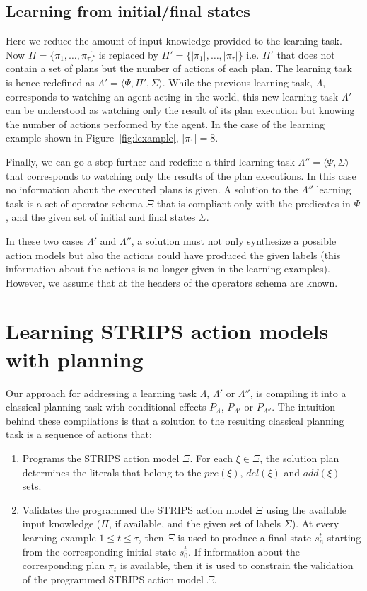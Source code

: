 \documentclass[letterpaper]{article} %
\newcommand{\tup}[1]{{\langle #1 \rangle}}
\begin{document}
\subsection{Learning from initial/final states}
Here we reduce the amount of input knowledge provided to the learning task. Now $\Pi=\{\pi_1,\ldots,\pi_{\tau}\}$ is replaced by $\Pi'=\{|\pi_1|,\ldots,|\pi_{\tau}|\}$ i.e. $\Pi'$ that does not contain a set of plans but the number of actions of each plan. The learning task is hence redefined as $\Lambda'=\tup{\Psi,\Pi',\Sigma}$. While the previous learning task, $\Lambda$, corresponds to watching an agent acting in the world, this new learning task $\Lambda'$ can be understood as watching only the result of its plan execution but knowing the number of actions performed by the agent. In the case of the learning example shown in Figure~\ref{fig:lexample}, $|\pi_1|=8$. 

Finally, we can go a step further and redefine a third learning task $\Lambda''=\tup{\Psi,\Sigma}$ that corresponds to watching only the results of the plan executions. In this case no information about the executed plans is given. A solution to the $\Lambda''$ learning task is a set of operator schema $\Xi$ that is compliant only with the predicates in $\Psi$, and the given set of initial and final states $\Sigma$.

In these two cases $\Lambda'$ and $\Lambda''$, a solution must not only synthesize a possible action models but also the actions could have produced the given labels (this information about the actions is no longer given in the learning examples). However, we assume that at the headers of the operators schema are known. 


\section{Learning STRIPS action models with planning}
Our approach for addressing a learning task $\Lambda$, $\Lambda'$ or $\Lambda''$, is compiling it into a classical planning task with conditional effects $P_{\Lambda}$, $P_{\Lambda'}$ or $P_{\Lambda''}$. The intuition behind these compilations is that a solution to the resulting classical planning task is a sequence of actions that:
\begin{enumerate}
\item Programs the STRIPS action model $\Xi$. For each $\xi\in\Xi$, the solution plan determines the literals that belong to the $pre(\xi)$, $del(\xi)$ and $add(\xi)$ sets.
\item Validates the programmed the STRIPS action model $\Xi$ using the available input knowledge ($\Pi$, if available, and the given set of labels $\Sigma$).  At every learning example {\small $1\leq t\leq \tau$}, then $\Xi$ is used to produce a final state $s_{n}^t$ starting from the corresponding initial state $s_0^t$. If information about the corresponding plan $\pi_t$ is available, then it is used to constrain the validation of the programmed STRIPS action model $\Xi$.
\end{enumerate}
\end{document}
